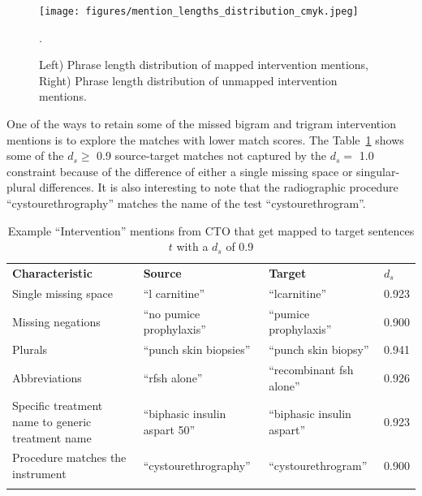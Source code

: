 \documentclass[11pt]{article}
\begin{document}
%
%
%
\begin{figure}[hbt!]
\centering
\texttt{[image: figures/mention\_lengths\_distribution\_cmyk.jpeg]}
\caption{Left) Phrase length distribution of mapped intervention mentions, Right) Phrase length distribution of unmapped intervention mentions.}.
\label{app:length_mappedunmapped}
\end{figure}
%
%
%
One of the ways to retain some of the missed bigram and trigram intervention mentions is to explore the matches with lower match scores.
The Table~\ref{table:conf9exp} shows some of the $d_s \geq$ 0.9 source-target matches not captured by the $d_s =$ 1.0 constraint because of the difference of either a single missing space or singular-plural differences.
It is also interesting to note that the radiographic procedure ``cystourethrography'' matches the name of the test ``cystourethrogram''.
%
\begin{table}
\begin{center}
    \begin{tabular}{p{6cm}p{4cm}p{4cm}p{1cm}}
    \Xhline{1pt} \textbf{Characteristic} & \textbf{Source} & \textbf{Target} & \textbf{$d_s$} \\ \Xhline{1pt}
    Single missing space & ``l carnitine'' & ``lcarnitine'' & 0.923\\
    Missing negations & ``no pumice prophylaxis''&  ``pumice prophylaxis''  & 0.900\\
    Plurals & ``punch skin biopsies'' &  ``punch skin biopsy''  & 0.941\\
    Abbreviations & ``rfsh alone'' & ``recombinant fsh alone'' & 0.926\\
    Specific treatment name to generic treatment name & ``biphasic insulin aspart 50'' & ``biphasic insulin aspart'' & 0.923\\
    Procedure matches the instrument & ``cystourethrography'' & ``cystourethrogram'' & 0.900\\
    \Xhline{1pt}
    \end{tabular}
\end{center}
\caption{Example ``Intervention'' mentions from CTO that get mapped to target sentences $t$ with a $d_{s}$ of 0.9}
\label{table:conf9exp} 
\end{table} 
%
%
%
\end{document}
